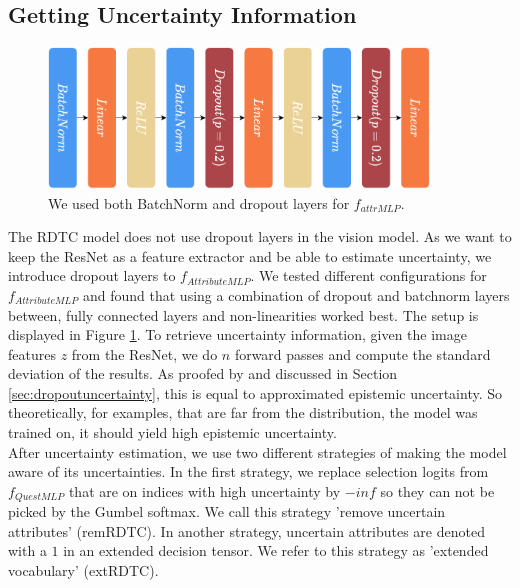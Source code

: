 \documentclass[a4paper,cleardoubleempty,BCOR1cm, 11pt]{report}
\begin{document}
\subsection{Getting Uncertainty Information}
\begin{figure}
	\centering
	\includegraphics[width=0.9\textwidth]{images/f_attrMLP.pdf} 
	\caption{We used both BatchNorm and dropout layers for $f_{attrMLP}$.}
	\label{fig:f_attrMLP}
\end{figure}
The RDTC model does not use dropout layers in the vision model. As we want to keep the ResNet as a feature extractor and be able to estimate uncertainty, we introduce dropout layers to $f_{AttributeMLP}$. We tested different configurations for $f_{AttributeMLP}$ and found that using a combination of dropout and batchnorm layers between, fully connected layers and non-linearities worked best. The setup is displayed in Figure \ref{fig:f_attrMLP}. To retrieve uncertainty information, given the image features $z$ from the ResNet, we do $n$ forward passes and compute the standard deviation of the results. As proofed by \citet{gal2016dropout} and discussed in Section \ref{sec:dropoutuncertainty}, this is equal to approximated epistemic uncertainty. So theoretically, for examples, that are far from the distribution, the model was trained on, it should yield high epistemic uncertainty.\\
After uncertainty estimation, we use two different strategies of making the model aware of its uncertainties. In the first strategy, we replace selection logits from $f_{QuestMLP}$ that are on indices with high uncertainty by $-inf$ so they can not be picked by the Gumbel softmax. We call this strategy 'remove uncertain attributes' (remRDTC). In another strategy, uncertain attributes are denoted with a $1$ in an extended decision tensor. We refer to this strategy as 'extended vocabulary' (extRDTC).
\end{document}
